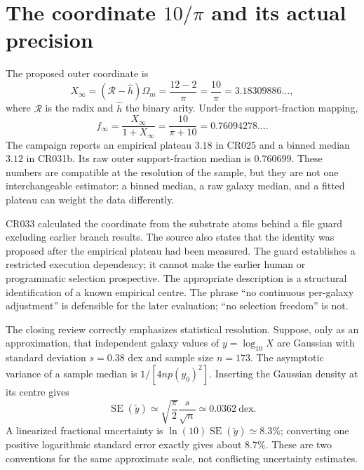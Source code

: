 \section{The coordinate \texorpdfstring{$10/\pi$}{10/pi} and its actual precision}

The proposed outer coordinate is
\begin{equation}
 X_\infty=(\mathcal R-\widehat h)\Omega_m
 =\frac{12-2}{\pi}=\frac{10}{\pi}=3.18309886\ldots,
 \label{c10:coordinate}
\end{equation}
where $\mathcal R$ is the radix and $\widehat h$ the binary arity. Under the support-fraction mapping,
\begin{equation}
 f_\infty=\frac{X_\infty}{1+X_\infty}
 =\frac{10}{\pi+10}=0.76094278\ldots.
 \label{c10:fraction}
\end{equation}
The campaign reports an empirical plateau $3.18$ in CR025 and a binned median $3.12$ in CR031b. Its raw outer support-fraction median is $0.760699$. These numbers are compatible at the resolution of the sample, but they are not one interchangeable estimator: a binned median, a raw galaxy median, and a fitted plateau can weight the data differently.

CR033 calculated the coordinate from the substrate atoms behind a file guard excluding earlier branch results. The source also states that the identity was proposed after the empirical plateau had been measured. The guard establishes a restricted execution dependency; it cannot make the earlier human or programmatic selection prospective. The appropriate description is a structural identification of a known empirical centre. The phrase ``no continuous per-galaxy adjustment'' is defensible for the later evaluation; ``no selection freedom'' is not.

The closing review correctly emphasizes statistical resolution. Suppose, only as an approximation, that independent galaxy values of $y=\log_{10}X$ are Gaussian with standard deviation $s=0.38$ dex and sample size $n=173$. The asymptotic variance of a sample median is $1/[4n p(y_0)^2]$. Inserting the Gaussian density at its centre gives
\begin{equation}
 \operatorname{SE}(\widetilde y)\simeq
 \sqrt{\frac{\pi}{2}}\frac{s}{\sqrt n}
 \simeq0.0362\ \mathrm{dex}.
 \label{c10:medianerror}
\end{equation}
A linearized fractional uncertainty is $\ln(10)\operatorname{SE}(\widetilde y)\simeq8.3\%$; converting one positive logarithmic standard error exactly gives about $8.7\%$. These are two conventions for the same approximate scale, not conflicting uncertainty estimates.

